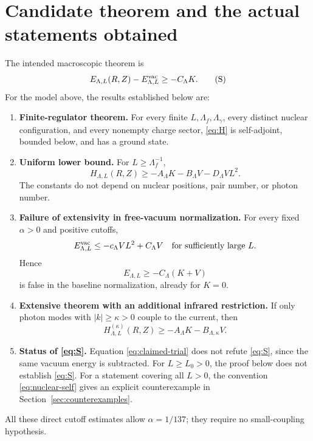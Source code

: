 \section{Candidate theorem and the actual statements obtained}
\label{sec:claims}
The intended macroscopic theorem is
\begin{equation}
E_{\Lambda,L}(R,Z)-E^{\mathrm{vac}}_{\Lambda,L}\ge-C_\Lambda K.
\tag{S}\label{eq:S}
\end{equation}
For the model above, the results established below are:
\begin{enumerate}
\item \textbf{Finite-regulator theorem.}
For every finite \(L,\Lambda_f,\Lambda_\gamma\), every distinct nuclear
configuration, and every nonempty charge sector, \eqref{eq:H} is
self-adjoint, bounded below, and has a ground state.
\item \textbf{Uniform lower bound.} For \(L\ge\Lambda_f^{-1}\),
\begin{equation}
H_{\Lambda,L}(R,Z)\ge
-A_\Lambda K-B_\Lambda V-D_\Lambda VL^2.
\label{eq:claimed-lower}
\end{equation}
The constants do not depend on nuclear positions, pair number, or photon number.
\item \textbf{Failure of extensivity in free-vacuum normalization.}
For every fixed \(\alpha>0\) and positive cutoffs,
\begin{equation}
E^{\mathrm{vac}}_{\Lambda,L}\le-c_\Lambda VL^2+C_\Lambda V
\quad\text{for sufficiently large }L.
\label{eq:claimed-trial}
\end{equation}
Hence
\begin{equation}
E_{\Lambda,L}\ge-C_\Lambda(K+V)
\tag{W}\label{eq:W}
\end{equation}
is false in the baseline normalization, already for \(K=0\).
\item \textbf{Extensive theorem with an additional infrared restriction.}
If only photon modes with \(|k|\ge\kappa>0\) couple to the current, then
\begin{equation}
H_{\Lambda,L}^{(\kappa)}(R,Z)
\ge-A_\Lambda K-B_{\Lambda,\kappa}V.
\label{eq:claimed-ir}
\end{equation}
\item \textbf{Status of \eqref{eq:S}.}
Equation \eqref{eq:claimed-trial} does not refute \eqref{eq:S}, since the
same vacuum energy is subtracted. For \(L\ge L_0>0\), the proof below
does not establish \eqref{eq:S}. For a statement covering all \(L>0\),
the convention \eqref{eq:nuclear-self} gives an explicit counterexample
in Section~\ref{sec:counterexamples}.
\end{enumerate}
All these direct cutoff estimates allow \(\alpha=1/137\); they require no
small-coupling hypothesis.

